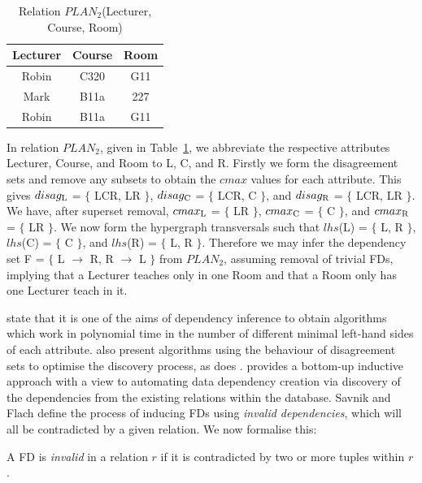 {\line
\begin{table}[ht]
\begin{center}
\begin{tabular}{||c|c|c||} \hline
{ \bf Lecturer} & { \bf Course} & { \bf Room} \\ \hline
 Robin & C320 & G11 \\
 Mark  & B11a & 227 \\
 Robin & B11a & G11 \\ \hline
\end{tabular}
\end{center}
\caption{\label{tbl:depinf} Relation $PLAN_2$(Lecturer, Course, Room)} 
\end{table}
}


\begin{example}
\begin{rm} 
In relation $PLAN_2$, given in Table~\ref{tbl:depinf}, we abbreviate the
respective attributes Lecturer, Course, and Room to L, C, and
R. Firstly we form the disagreement sets and remove any subsets to
obtain the $cmax$ values for each attribute. This gives
$disag_{\rm L}$ = $\{$ LCR, LR $\}$, $disag_{\rm C}$ = $\{$ LCR, C $\}$, and $disag_{\rm R}$
= $\{$ LCR, LR $\}$. We have, after superset removal,  $cmax_{\rm L}$
= $\{$ LR $\}$, $cmax_{\rm C}$ = $\{$ C $\}$, and $cmax_{\rm R}$ 
= $\{$ LR $\}$. We now form the hypergraph transversals such that
$lhs$(L) = $\{$ L, R $\}$, $lhs$(C) = $\{$ C $\}$, and $lhs$(R) = $\{$
L, R $\}$. Therefore we may infer
the dependency set F = $\{$ L $\to$ R, R $\to$ L $\}$ from $PLAN_2$,
assuming removal of trivial FDs, implying that a Lecturer teaches only
in one Room and that a Room only has one Lecturer teach in it.
\end{rm}
\end{example}


\cite{mr92} state that it is
one of the aims of dependency inference to 
obtain algorithms which work in polynomial time in the number of 
different minimal left-hand sides of each attribute. \cite{bmt89,Mann92}
also present algorithms using the behaviour of disagreement sets to
optimise the discovery process, as does \cite{sf93}. 
\cite{sf93} provides a bottom-up inductive approach with a view to
automating data dependency creation via discovery of the dependencies
from the existing relations within the database.  Savnik and Flach define
the process of inducing FDs using {\em invalid
dependencies}, which will all be contradicted by a given relation. 
We now formalise this:
\begin{definition}
\begin{rm}
A FD is {\em invalid} in a relation $r$
if it is contradicted by two or more tuples within $r$.
\end{rm}
\end{definition}

